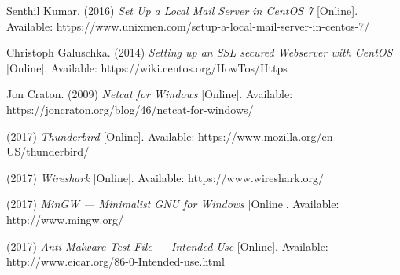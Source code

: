 \documentclass[10pt,conference]{IEEEtran}
\begin{document}

%
%
%
\begin{thebibliography}{6}

Senthil Kumar.  (2016) \emph{Set Up a Local Mail Server in CentOS 7} [Online].
  Available: https://www.unixmen.com/setup-a-local-mail-server-in-centos-7/
  
Christoph Galuschka.  (2014) \emph{Setting up an SSL secured Webserver with CentOS} [Online].
  Available: https://wiki.centos.org/HowTos/Https

Jon Craton.  (2009) \emph{Netcat for Windows} [Online].
  Available: https://joncraton.org/blog/46/netcat-for-windows/

(2017) \emph{Thunderbird} [Online].
  Available: https://www.mozilla.org/en-US/thunderbird/

(2017) \emph{Wireshark} [Online].
  Available: https://www.wireshark.org/

(2017) \emph{MinGW --- Minimalist GNU for Windows} [Online].
  Available: http://www.mingw.org/

(2017) \emph{Anti-Malware Test File --- Intended Use} [Online].
  Available: http://www.eicar.org/86-0-Intended-use.html

\end{thebibliography}


\end{document}
